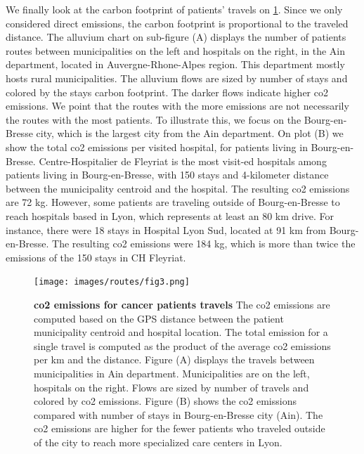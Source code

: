 We finally look at the carbon footprint of patients' travels on
\cref{fig:routes-co2-emissions}. Since we only considered direct emissions, the
carbon footprint is proportional to the traveled distance. The alluvium chart on
sub-figure (A) displays the number of patients routes between municipalities on
the left and hospitals on the right, in the Ain department, located in
Auvergne-Rhone-Alpes region. This department mostly hosts rural municipalities.
The alluvium flows are sized by number of stays and colored by the stays carbon
footprint. The darker flows indicate higher \ac{co2} emissions. We point that
the routes with the more emissions are not necessarily the routes with the most
patients. To illustrate this, we focus on the Bourg-en-Bresse city, which is the
largest city from the Ain department. On plot (B) we show the total \ac{co2}
emissions per visited hospital, for patients living in Bourg-en-Bresse.
Centre-Hospitalier de Fleyriat is the most visit-ed hospitals among patients
living in Bourg-en-Bresse, with 150 stays and 4-kilometer distance between the
municipality centroid and the hospital. The resulting \ac{co2} emissions are 72
kg. However, some patients are traveling outside of Bourg-en-Bresse to reach
hospitals based in Lyon, which represents at least an 80 km drive. For instance,
there were 18 stays in Hospital Lyon Sud, located at 91 km from Bourg-en-Bresse.
The resulting \ac{co2} emissions were 184 kg, which is more than twice the
emissions of the 150 stays in CH Fleyriat.

\begin{figure}[H]
    \texttt{[image: images/routes/fig3.png]}
    \centering
    \caption{ \textbf{\ac{co2} emissions for cancer patients travels} The
        \ac{co2} emissions are computed based on the GPS distance between the
        patient municipality centroid and hospital location. The total emission
        for a single travel is computed as the product of the average \ac{co2}
        emissions per km and the distance. Figure (A) displays the travels
        between municipalities in Ain department. Municipalities are on the
        left, hospitals on the right. Flows are sized by number of travels and
        colored by \ac{co2} emissions. Figure (B) shows the \ac{co2} emissions
        compared with number of stays in Bourg-en-Bresse city (Ain). The
        \ac{co2} emissions are higher for the fewer patients who traveled
        outside of the city to reach more specialized care centers in Lyon. }
    \label{fig:routes-co2-emissions}
\end{figure}

